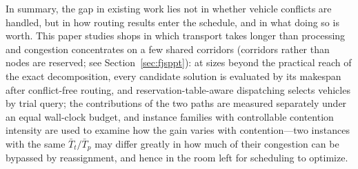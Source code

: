 \documentclass[manuscript,screen,review]{acmart}
\begin{document}
In summary, the gap in existing work lies not in whether vehicle conflicts are handled, but in how routing results enter the schedule, and in what doing so is worth.
This paper studies shops in which transport takes longer than processing and congestion concentrates on a few shared corridors (corridors rather than nodes are reserved; see Section~\ref{sec:fjsppt}): at sizes beyond the practical reach of the exact decomposition, every candidate solution is evaluated by its makespan after conflict-free routing, and reservation-table-aware dispatching selects vehicles by trial query; the contributions of the two paths are measured separately under an equal wall-clock budget, and instance families with controllable contention intensity are used to examine how the gain varies with contention---two instances with the same $\bar{T}_t/\bar{T}_p$ may differ greatly in how much of their congestion can be bypassed by reassignment, and hence in the room left for scheduling to optimize.
\end{document}
